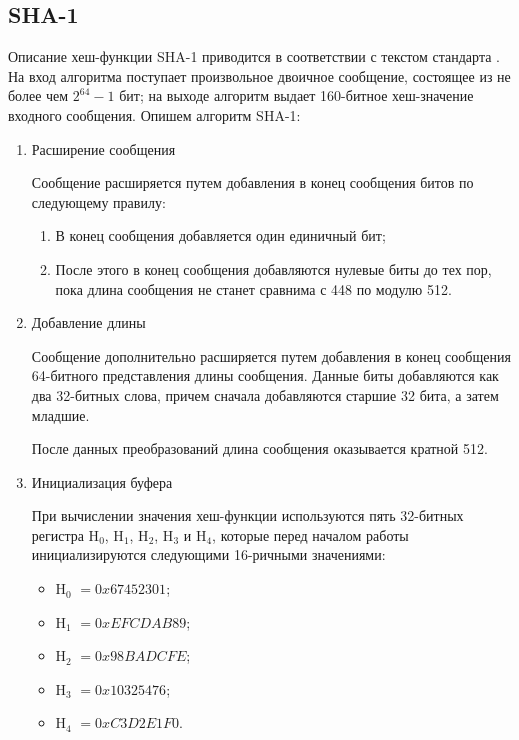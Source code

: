 \documentclass{./civarticle}
\begin{document}
\subsection{SHA-1}

Описание хеш-функции SHA-1 приводится в соответствии с текстом стандарта \cite{sha1}. На вход алгоритма поступает произвольное двоичное сообщение, состоящее из не более чем $2^{64} - 1$ бит; на выходе алгоритм выдает 160-битное хеш-значение входного сообщения. Опишем алгоритм SHA-1:

\begin{enumerate}
    \item Расширение сообщения

    Сообщение расширяется путем добавления в конец сообщения битов по следующему правилу:

    \begin{enumerate}
        \item В конец сообщения добавляется один единичный бит;
        \item После этого в конец сообщения добавляются нулевые биты до тех пор, пока длина сообщения не станет сравнима с 448 по модулю 512.
    \end{enumerate}

    \item Добавление длины

    Сообщение дополнительно расширяется путем добавления в конец сообщения 64-битного представления длины сообщения. Данные биты добавляются как два 32-битных слова, причем сначала добавляются старшие 32 бита, а затем младшие.

    После данных преобразований длина сообщения оказывается кратной 512.

    \item Инициализация буфера

    При вычислении значения хеш-функции используются пять 32-битных регистра H$_0$, H$_1$, H$_2$, H$_3$ и H$_4$, которые перед началом работы инициализируются следующими 16-ричными значениями:

    \begin{itemize}
        \item H$_0$ $= 0x67452301$;
        \item H$_1$ $= 0xEFCDAB89$;
        \item H$_2$ $= 0x98BADCFE$;
        \item H$_3$ $= 0x10325476$;
        \item H$_4$ $= 0xC3D2E1F0$.
    \end{itemize}


\end{enumerate}
\end{document}
